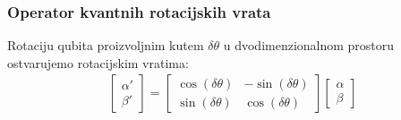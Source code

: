 \documentclass[times, utf8, zavrsni, numeric]{fer}
\begin{document}
\subsubsection{Operator kvantnih rotacijskih vrata}
Rotaciju qubita proizvoljnim kutem $\delta\theta$ u dvodimenzionalnom prostoru ostvarujemo rotacijskim vratima:
\begin{align}
\begin{bmatrix}
\alpha' \\ \beta'
\end{bmatrix}
=
\begin{bmatrix}
\cos(\delta\theta) & -\sin(\delta\theta) \\ \sin(\delta\theta) & \cos(\delta\theta)
\end{bmatrix}
\begin{bmatrix}
\alpha \\ \beta
\end{bmatrix}
\end{align} 
\end{document}
